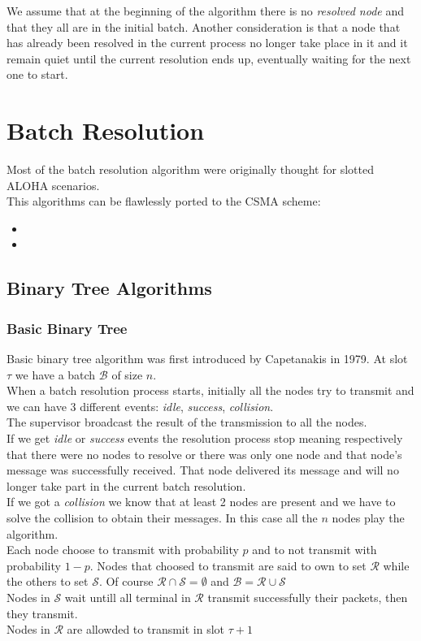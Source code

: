 \documentclass[12pt,a4paper]{report}
\begin{document}
We assume that at the beginning of the algorithm there is no \emph{resolved node} and that they all are in the initial batch.
Another consideration is that a node that has already been resolved in the current process no longer take place in it and it remain quiet until the current resolution ends up, eventually waiting for the next one to start.


\chapter{Batch Resolution}

Most of the batch resolution algorithm were originally thought for slotted ALOHA scenarios.\\
This algorithms can be flawlessly ported to the CSMA scheme:
\begin{itemize}
\item 
\item
\end{itemize}
  
\section{Binary Tree Algorithms}
\subsection{Basic Binary Tree}
Basic binary tree algorithm was first introduced by Capetanakis in 1979.
At slot $\tau$ we have a batch $\mathcal{B}$ of size $n$.\\
When a batch resolution process starts, initially all the nodes try to transmit and we can have 3 different events: \emph{idle}, \emph{success}, \emph{collision}.	\\
The supervisor broadcast the result of the transmission to all the nodes.\\
If we get \emph{idle} or  \emph{success} events the resolution process stop meaning respectively that there were no nodes to resolve or there was only one node and that node's message was successfully received. That node delivered its message and will no longer take part in the current batch resolution.\\
If we got a \emph{collision} we know that at least 2 nodes are present and we have to solve the collision to obtain their messages. In this case all the $n$ nodes play the algorithm.\\
Each node choose to transmit with probability $p$ and to not transmit with probability $1-p$. Nodes that choosed to transmit  are said to own to set $\mathcal{R}$ while the others to set $\mathcal{S}$. Of course $\mathcal{R}  \cap \mathcal{S} = \emptyset$ and $\mathcal{B} = \mathcal{R}  \cup \mathcal{S}$\\
Nodes in $\mathcal{S}$ wait untill all terminal in $\mathcal{R}$ transmit successfully their packets, then they transmit.\\
Nodes in $\mathcal{R}$ are allowded to transmit in slot $\tau +1$
\end{document}
